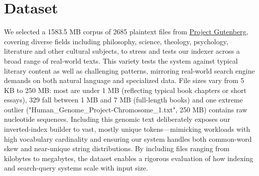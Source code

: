\section{Dataset}

\hypersetup{
	colorlinks=true,
	urlcolor=blue
}

We selected a 1583.5 MB corpus of 2685 plaintext files from \href{https://www.gutenberg.org/}{Project Gutenberg}, covering diverse fields including philosophy, science, theology, psychology, literature and other cultural subjects, to stress and tests our indexer across a broad range of real-world texts. This variety tests the system against typical literary content as well as challenging patterns, mirroring real-world search engine demands on both natural language and specialized data. File sizes vary from 5 KB to 250 MB: most are under 1 MB (reflecting typical book chapters or short essays), 329 fall between 1 MB and 7 MB (full-length books) and one extreme outlier ("Human\_Genome\_Project-Chromosome\_1.txt", 250 MB) contains raw nucleotide sequences. Including this genomic text deliberately exposes our inverted-index builder to vast, mostly unique tokens—mimicking workloads with high vocabulary cardinality and ensuring our system handles both common-word skew and near-unique string distributions. By including files ranging from kilobytes to megabytes, the dataset enables a rigorous evaluation of how indexing and search-query systems scale with input size. 



